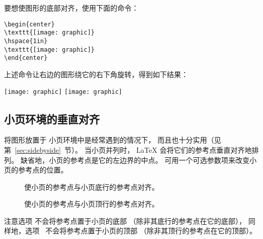 要想使图形的底部对齐，使用下面的命令：
\begin{lstlisting}
\begin{center}
\texttt{[image: graphic]}
\hspace{1in}
\texttt{[image: graphic]}
\end{center}
\end{lstlisting}
上述命令让右边的图形绕它的右下角旋转，得到如下结果：
\begin{center}
	\texttt{[image: graphic]}
	\hspace{1in}
	\texttt{[image: graphic]}
\end{center}

\subsection{小页环境的垂直对齐}\label{ssec:minivalign}

将图形放置于  小页环境中是经常遇到的情况下，
而且也十分实用（见第~\ref{sec:sidebyside}~节）。
当小页并列时， \LaTeX{} 会将它们的参考点垂直对齐地排列。
缺省地，小页的参考点是它的左边界的中点。
可用一个可选参数项来改变小页的参考点的位置。
\begin{description}
	\item[\opt{[b]}] 使小页的参考点与小页底行的参考点对齐。
	\item[\opt{[t]}] 使小页的参考点与小页顶行的参考点对齐。
\end{description}

注意选项 \opt{[b]} 不会将参考点置于小页的底部
（除非其底行的参考点在它的底部），
同样地，选项 \opt{[t]}~不会将参考点置于小页的顶部
（除非其顶行的参考点在它的顶部）。

